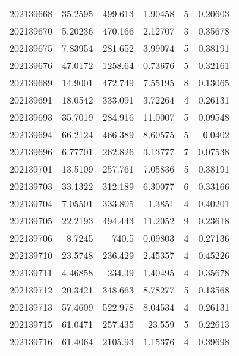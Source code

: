 \begin{tabular}{rrrrrr}
 202139668 &         35.2595  &      499.613  &            1.90458 &           5 & 0.20603 \\
 202139670 &          5.20236 &      470.166  &            2.12707 &           3 & 0.35678 \\
 202139675 &          7.83954 &      281.652  &            3.99074 &           5 & 0.38191 \\
 202139676 &         47.0172  &     1258.64   &            0.73676 &           5 & 0.32161 \\
 202139689 &         14.9001  &      472.749  &            7.55195 &           8 & 0.13065 \\
 202139691 &         18.0542  &      333.091  &            3.72264 &           4 & 0.26131 \\
 202139693 &         35.7019  &      284.916  &           11.0007  &           5 & 0.09548 \\
 202139694 &         66.2124  &      466.389  &            8.60575 &           5 & 0.0402  \\
 202139696 &          6.77701 &      262.826  &            3.13777 &           7 & 0.07538 \\
 202139701 &         13.5109  &      257.761  &            7.05836 &           5 & 0.38191 \\
 202139703 &         33.1322  &      312.189  &            6.30077 &           6 & 0.33166 \\
 202139704 &          7.05501 &      333.805  &            1.3851  &           4 & 0.40201 \\
 202139705 &         22.2193  &      494.443  &           11.2052  &           9 & 0.23618 \\
 202139706 &          8.7245  &      740.5    &            0.09803 &           4 & 0.27136 \\
 202139710 &         23.5748  &      236.429  &            2.45357 &           4 & 0.45226 \\
 202139711 &          4.46858 &      234.39   &            1.40495 &           4 & 0.35678 \\
 202139712 &         20.3421  &      348.663  &            8.78277 &           5 & 0.13568 \\
 202139713 &         57.4609  &      522.978  &            8.04534 &           4 & 0.26131 \\
 202139715 &         61.0471  &      257.435  &           23.559   &           5 & 0.22613 \\
 202139716 &         61.4064  &     2105.93   &            1.15376 &           4 & 0.39698 \\

\end{tabular}
